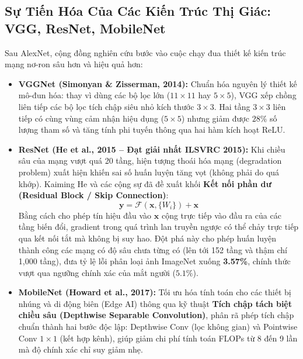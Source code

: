 \documentclass[12pt,a4paper]{report}
\begin{document}
\subsection{Sự Tiến Hóa Của Các Kiến Trúc Thị Giác: VGG, ResNet, MobileNet}
Sau AlexNet, cộng đồng nghiên cứu bước vào cuộc chạy đua thiết kế kiến trúc mạng nơ-ron sâu hơn và hiệu quả hơn:
\begin{itemize}[leftmargin=1.2cm]
    \item \textbf{VGGNet (Simonyan \& Zisserman, 2014):} Chuẩn hóa nguyên lý thiết kế mô-đun hóa: thay vì dùng các bộ lọc lớn ($11 \times 11$ hay $5 \times 5$), VGG xếp chồng liên tiếp các bộ lọc tích chập siêu nhỏ kích thước $3 \times 3$. Hai tầng $3 \times 3$ liên tiếp có cùng vùng cảm nhận hiệu dụng ($5 \times 5$) nhưng giảm được $28\%$ số lượng tham số và tăng tính phi tuyến thông qua hai hàm kích hoạt ReLU.
    \item \textbf{ResNet (He et al., 2015 -- Đạt giải nhất ILSVRC 2015):} Khi chiều sâu của mạng vượt quá 20 tầng, hiện tượng thoái hóa mạng (degradation problem) xuất hiện khiến sai số huấn luyện tăng vọt (không phải do quá khớp). Kaiming He và các cộng sự đã đề xuất khối \textbf{Kết nối phần dư (Residual Block / Skip Connection)}:
    \begin{equation}
    \mathbf{y} = \mathcal{F}(\mathbf{x}, \{W_i\}) + \mathbf{x}
    \end{equation}
    Bằng cách cho phép tín hiệu đầu vào $\mathbf{x}$ cộng trực tiếp vào đầu ra của các tầng biến đổi, gradient trong quá trình lan truyền ngược có thể chảy trực tiếp qua kết nối tắt mà không bị suy hao. Đột phá này cho phép huấn luyện thành công các mạng có độ sâu chưa từng có (lên tới 152 tầng và thậm chí 1,000 tầng), đưa tỷ lệ lỗi phân loại ảnh ImageNet xuống \textbf{3.57\%}, chính thức vượt qua ngưỡng chính xác của mắt người ($5.1\%$).
    \item \textbf{MobileNet (Howard et al., 2017):} Tối ưu hóa tính toán cho các thiết bị nhúng và di động biên (Edge AI) thông qua kỹ thuật \textbf{Tích chập tách biệt chiều sâu (Depthwise Separable Convolution)}, phân rã phép tích chập chuẩn thành hai bước độc lập: Depthwise Conv (lọc không gian) và Pointwise Conv $1 \times 1$ (kết hợp kênh), giúp giảm chi phí tính toán FLOPs từ 8 đến 9 lần mà độ chính xác chỉ suy giảm nhẹ.
\end{itemize}
\end{document}
